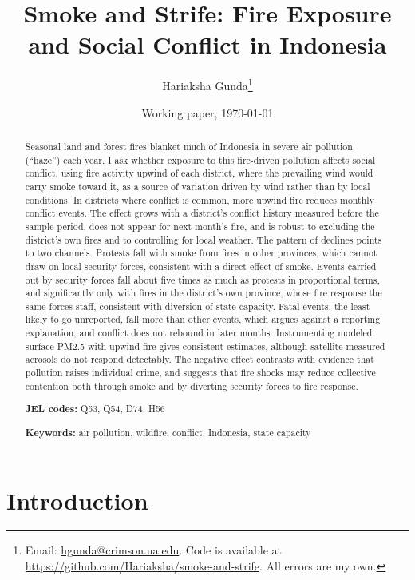 \documentclass[12pt]{article}
\title{Smoke and Strife: Fire Exposure and Social Conflict in Indonesia}
\author{Hariaksha Gunda\thanks{Email: \href{mailto:hgunda@crimson.ua.edu}{hgunda@crimson.ua.edu}. Code is available at \url{https://github.com/Hariaksha/smoke-and-strife}. All errors are my own.}}
\affil{The University of Alabama}
\date{Working paper, \today}
\begin{document}
\maketitle

\begin{abstract}
Seasonal land and forest fires blanket much of Indonesia in severe air pollution (``haze'') each year. I ask whether exposure to this fire-driven pollution affects social conflict, using fire activity upwind of each district, where the prevailing wind would carry smoke toward it, as a source of variation driven by wind rather than by local conditions. In districts where conflict is common, more upwind fire reduces monthly conflict events. The effect grows with a district's conflict history measured before the sample period, does not appear for next month's fire, and is robust to excluding the district's own fires and to controlling for local weather. The pattern of declines points to two channels. Protests fall with smoke from fires in other provinces, which cannot draw on local security forces, consistent with a direct effect of smoke. Events carried out by security forces fall about five times as much as protests in proportional terms, and significantly only with fires in the district's own province, whose fire response the same forces staff, consistent with diversion of state capacity. Fatal events, the least likely to go unreported, fall more than other events, which argues against a reporting explanation, and conflict does not rebound in later months. Instrumenting modeled surface PM2.5 with upwind fire gives consistent estimates, although satellite-measured aerosols do not respond detectably. The negative effect contrasts with evidence that pollution raises individual crime, and suggests that fire shocks may reduce collective contention both through smoke and by diverting security forces to fire response.

\medskip
\noindent\textbf{JEL codes:} Q53, Q54, D74, H56

\noindent\textbf{Keywords:} air pollution, wildfire, conflict, Indonesia, state capacity
\end{abstract}

\section{Introduction}
\end{document}
